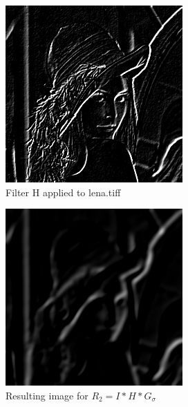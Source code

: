 \documentclass{article}
\begin{document}
\begin{figure}[H]
  \begin{center}
    \includegraphics[width=\textwidth]{./images/imH.png}
    \caption{Filter H applied to lena.tiff}
    \label{lenaH}
  \end{center}
\end{figure}

\begin{figure}[H]
  \begin{center}
    \includegraphics[width=\textwidth]{./images/imR2.png}
    \caption{Resulting image for $R_2 = I * H * G_{\sigma}$}
    \label{lenaR2}
  \end{center}
\end{figure}
\end{document}
